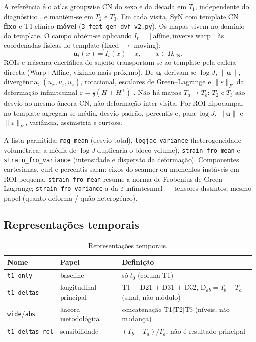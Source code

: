 \documentclass[review]{elsarticle}
\newcommand{\code}[1]{\texttt{#1}}
\begin{document}
	A referência é o atlas groupwise CN do sexo e da década em $T_1$, independente do diagnóstico \cite{wyman-2013}, e mantém-se em $T_2$ e $T_3$.
	Em cada visita, SyN com template CN \textbf{fixo} e T1 clínico \textbf{móvel} (\code{3\_feat\_gen\_dvf\_v2.py}).
	Os mapas vivem no domínio do template. O campo obtém-se aplicando $I_t=[\text{affine},\text{inverse warp}]$ às coordenadas físicas do template (fixed $\rightarrow$ moving):
	\begin{equation}
		\mathbf{u}_t(x)=I_t(x)-x,\qquad x\in\Omega_{\mathrm{CN}}.
		\label{eq:dvf-template}
	\end{equation}
	ROIs e máscara encefálica do sujeito transportam-se ao template pela cadeia directa (Warp$+$Affine, vizinho mais próximo).
	De $\mathbf{u}_t$ derivam-se $\log J$, $\|\mathbf{u}\|$, divergência, $(u_x,u_y,u_z)$, rotacional, escalares de Green--Lagrange e $\|\varepsilon\|_F$ da deformação infinitesimal $\varepsilon=\tfrac12(H+H^{\top})$ \cite{bouke-2023}.
	Não há mapas $T_a\rightarrow T_b$: $T_2$ e $T_3$ são desvio ao mesmo âncora CN, não deformação inter-visita.
	Por ROI hipocampal no template agregam-se média, desvio-padrão, percentis e, para $\log J$, $\|\mathbf{u}\|$ e $\|\varepsilon\|_F$, variância, assimetria e curtose.
	
	A lista permitida: \code{mag\_mean} (desvio total), \code{logjac\_variance} (heterogeneidade volumétrica; a média de $\log J$ duplicaria o bloco volume), \code{strain\_fro\_mean} e \code{strain\_fro\_variance} (intensidade e dispersão da deformação).
	Componentes cartesianas, curl e percentis saem: eixos do scanner ou momentos instáveis em ROI pequena.
	\code{strain\_fro\_mean} resume a norma de Frobenius de Green--Lagrange; \code{strain\_fro\_variance} a da $\varepsilon$ infinitesimal --- tensores distintos, mesmo papel (quanto deforma / quão heterogéneo).
	
	\subsection{Representações temporais}
	\label{sec:atributos}
	
	\begin{table}[htbp]
		\centering
		\caption{Representações temporais.}
		\label{tab:reps}
		\begin{tabular}{llp{7.2cm}}
			\toprule
			Nome & Papel & Definição \\
			\midrule
			\code{t1\_only}    & baseline & só $t_0$ (coluna T1) \\
			\code{t1\_deltas}  & longitudinal principal & T1 $+$ D21 $+$ D31 $+$ D32, $\mathrm{D}_{ab}=T_b-T_a$ (sinal; não módulo) \\
			\code{wide}/\code{abs} & âncora metodológica & concatenação T1$|$T2$|$T3 (níveis, não mudança) \\
			\code{t1\_deltas\_rel} & sensibilidade & $(T_b-T_a)/T_a$; não é resultado principal \\
			\bottomrule
		\end{tabular}
	\end{table}
	
\end{document}
